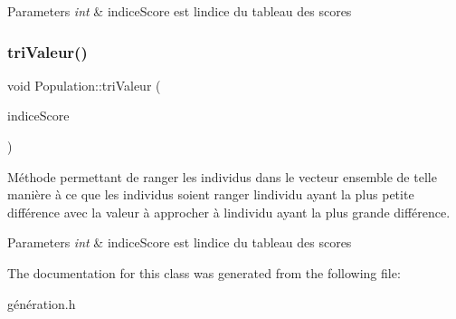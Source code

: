 \begin{DoxyParams}{Parameters}
{\em int} & indice\+Score est l\textquotesingle{}indice du tableau des scores \\
\hline
\end{DoxyParams}
\mbox{\label{class_population_a4b167d07f145a1f1ea69b2bb4cfd2cfb}} 
\subsubsection{\texorpdfstring{tri\+Valeur()}{triValeur()}}
{\footnotesize\ttfamily void Population\+::tri\+Valeur (\begin{DoxyParamCaption}\item[{int}]{indice\+Score }\end{DoxyParamCaption})}



Méthode permettant de ranger les individus dans le vecteur ensemble de telle manière à ce que les individus soient ranger l\textquotesingle{}individu ayant la plus petite différence avec la valeur à approcher à l\textquotesingle{}individu ayant la plus grande différence. 


\begin{DoxyParams}{Parameters}
{\em int} & indice\+Score est l\textquotesingle{}indice du tableau des scores \\
\hline
\end{DoxyParams}


The documentation for this class was generated from the following file\+:\begin{DoxyCompactItemize}
\item 
génération.\+h\end{DoxyCompactItemize}
